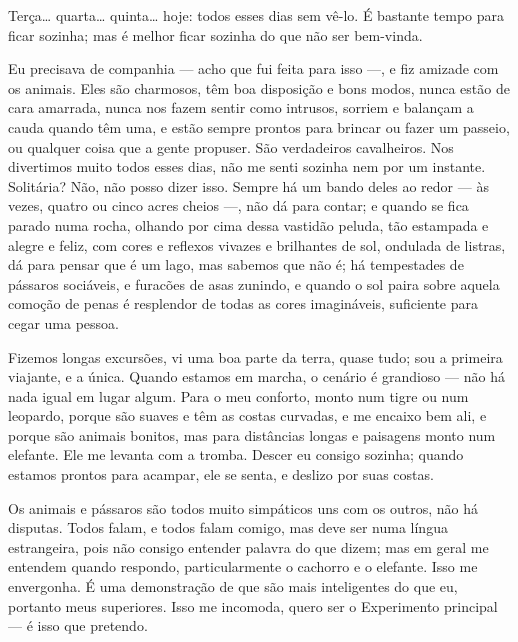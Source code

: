 \begin{center}
\leafNE
\end{center}


 Terça\ldots{} quarta\ldots{} quinta\ldots{} hoje: todos esses
dias sem vê-lo. É bastante tempo para ficar sozinha; mas é melhor ficar sozinha
do que não ser bem-vinda.

Eu precisava de companhia --- acho que fui feita para isso ---, e fiz 
amizade com os animais. Eles são charmosos, têm boa disposição e
bons modos, nunca estão de cara amarrada, nunca nos fazem sentir como
intrusos, sorriem e balançam a cauda quando têm uma, e estão sempre
prontos para brincar ou fazer um passeio, ou qualquer coisa que a gente
propuser. São verdadeiros cavalheiros. Nos divertimos muito todos esses dias, 
não me senti sozinha nem por um instante. Solitária? Não, não posso
dizer isso. Sempre há um bando deles ao redor --- às vezes, quatro ou
cinco acres cheios ---, não dá para contar; e quando se fica parado numa
rocha, olhando por cima dessa vastidão peluda, tão estampada e alegre e feliz,
com cores e reflexos vivazes e brilhantes de sol, ondulada de listras, dá para
pensar que é um lago, mas sabemos que não é; há tempestades de pássaros
sociáveis, e furacões de asas zunindo, e quando o sol paira sobre aquela
comoção de penas é resplendor de todas as cores imagináveis,
suficiente para cegar uma pessoa.

Fizemos longas excursões, vi uma boa parte da terra, quase tudo;
sou a primeira viajante, e a única. Quando estamos em marcha, o cenário
é grandioso --- não há nada igual em lugar algum. Para o meu conforto, monto
num tigre ou num leopardo, porque são suaves e têm as costas curvadas, e me
encaixo bem ali, e porque são animais bonitos, mas para distâncias longas e paisagens
monto num elefante. Ele me levanta com a tromba. Descer eu consigo
sozinha; quando estamos prontos para acampar, ele se senta, e deslizo por suas costas.

Os animais e pássaros são todos muito simpáticos uns com os outros, não há
disputas. Todos falam, e todos falam comigo, mas deve
ser numa língua estrangeira, pois não consigo entender palavra do
que dizem; mas em geral me entendem quando respondo, particularmente o
cachorro e o elefante. Isso me envergonha. É uma demonstração de que são mais
inteligentes do que eu, portanto meus superiores. Isso me incomoda, quero ser
o Experimento principal --- é isso que pretendo.

